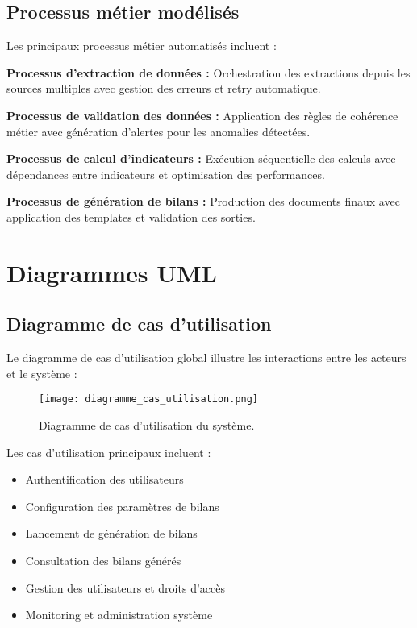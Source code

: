 \subsection{Processus métier modélisés}

Les principaux processus métier automatisés incluent :

\medskip

\textbf{Processus d'extraction de données :} Orchestration des extractions depuis les sources multiples avec gestion des erreurs et retry automatique.

\textbf{Processus de validation des données :} Application des règles de cohérence métier avec génération d'alertes pour les anomalies détectées.

\textbf{Processus de calcul d'indicateurs :} Exécution séquentielle des calculs avec dépendances entre indicateurs et optimisation des performances.

\textbf{Processus de génération de bilans :} Production des documents finaux avec application des templates et validation des sorties.

\section{Diagrammes UML}

\subsection{Diagramme de cas d'utilisation}

Le diagramme de cas d'utilisation global illustre les interactions entre les acteurs et le système :

\begin{figure}[hbt!]
    \centering
    \texttt{[image: diagramme\_cas\_utilisation.png]}
    \caption{Diagramme de cas d'utilisation du système.}
    \label{fig:cas-utilisation}
\end{figure}

Les cas d'utilisation principaux incluent :

\begin{itemize}
    \item Authentification des utilisateurs
    \item Configuration des paramètres de bilans
    \item Lancement de génération de bilans
    \item Consultation des bilans générés
    \item Gestion des utilisateurs et droits d'accès
    \item Monitoring et administration système
\end{itemize}

